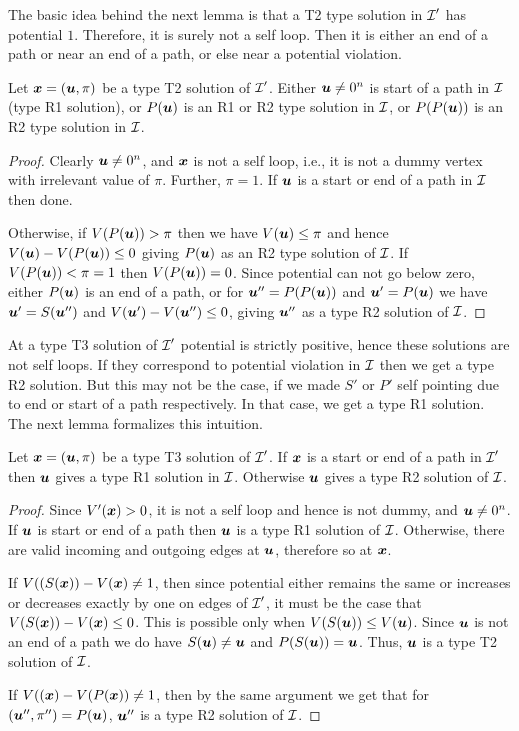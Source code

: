 The basic idea behind the next lemma is that a T2 type solution in $\mbox{${\mathcal I}$}'$ has
potential $1$. Therefore, it is surely not a self loop. Then it is either an end of a path or near an end of a path, or else near a potential violation. 

\begin{lemma}\label{lem:p2m-t2}
Let $\mbox{\boldmath $x$}=(\mbox{\boldmath $u$},\pi)$ be a type T2 solution of $\mbox{${\mathcal I}$}'$. Either $\mbox{\boldmath $u$} \neq 0^n$ is start of a path in $\mbox{${\mathcal I}$}$ (type R1 solution), or $P(\mbox{\boldmath $u$})$ is an R1 or R2 type solution in $\mbox{${\mathcal I}$}$, or $P(P(\mbox{\boldmath $u$}))$ is an R2 type solution in $\mbox{${\mathcal I}$}$.
\end{lemma}

\begin{proof}
Clearly $\mbox{\boldmath $u$} \neq 0^n$, and $\mbox{\boldmath $x$}$ is not a self loop, i.e., it is not a dummy vertex with irrelevant value of $\pi$. Further, $\pi=1$. If $\mbox{\boldmath $u$}$ is a start or end of a path in $\mbox{${\mathcal I}$}$ then done. 

Otherwise, if $V(P(\mbox{\boldmath $u$}))>\pi$ then we have $V(\mbox{\boldmath $u$})\le \pi$ and hence $V(\mbox{\boldmath $u$})-V(P(\mbox{\boldmath $u$}))\le 0$ giving $P(\mbox{\boldmath $u$})$ as an R2 type solution of $\mbox{${\mathcal I}$}$. 
If $V(P(\mbox{\boldmath $u$}))<\pi=1$ then $V(P(\mbox{\boldmath $u$}))=0$. Since potential can not go below zero, either $P(\mbox{\boldmath $u$})$ is an end of a path, or for $\mbox{\boldmath $u$}''=P(P(\mbox{\boldmath $u$}))$ and $\mbox{\boldmath $u$}'=P(\mbox{\boldmath $u$})$ we have $\mbox{\boldmath $u$}'=S(\mbox{\boldmath $u$}'')$ and $V(\mbox{\boldmath $u$}')-V(\mbox{\boldmath $u$}'')\le 0$, giving $\mbox{\boldmath $u$}''$ as a type R2 solution of $\mbox{${\mathcal I}$}$.
\end{proof}

At a type T3 solution of $\mbox{${\mathcal I}$}'$ potential is strictly positive, hence these solutions are not self loops. If they correspond to potential violation in $\mbox{${\mathcal I}$}$ then we get a type R2 solution. But this may not be the case, if we made $S'$ or $P'$ self pointing due to end or start of a path respectively. In that case, we get a type R1 solution. The next lemma formalizes this intuition. 

\begin{lemma}\label{lem:p2m-t3}
Let $\mbox{\boldmath $x$}=(\mbox{\boldmath $u$},\pi)$ be a type T3 solution of $\mbox{${\mathcal I}$}'$. If $\mbox{\boldmath $x$}$ is a start or end of a path in $\mbox{${\mathcal I}$}'$ then $\mbox{\boldmath $u$}$ gives a type R1 solution in $\mbox{${\mathcal I}$}$. Otherwise $\mbox{\boldmath $u$}$ gives a type R2 solution of $\mbox{${\mathcal I}$}$.
\end{lemma}

\begin{proof}
Since $V'(\mbox{\boldmath $x$})>0$, it is not a self loop and hence is not dummy, and $\mbox{\boldmath $u$}\neq 0^n$. If $\mbox{\boldmath $u$}$ is start or end of a path then $\mbox{\boldmath $u$}$ is a type R1 solution of $\mbox{${\mathcal I}$}$. Otherwise, there are valid incoming and outgoing edges at $\mbox{\boldmath $u$}$, therefore so at $\mbox{\boldmath $x$}$. 

If $V((S(\mbox{\boldmath $x$}))-V(\mbox{\boldmath $x$})\neq 1$, then since potential either remains the same or increases or decreases exactly by one on edges of $\mbox{${\mathcal I}$}'$, it must be the case that $V(S(\mbox{\boldmath $x$}))-V(\mbox{\boldmath $x$})\le 0$. This is possible only when $V(S(\mbox{\boldmath $u$}))\le V(\mbox{\boldmath $u$})$. Since $\mbox{\boldmath $u$}$ is not an end of a path we do have $S(\mbox{\boldmath $u$})\neq \mbox{\boldmath $u$}$ and $P(S(\mbox{\boldmath $u$}))=\mbox{\boldmath $u$}$. Thus, $\mbox{\boldmath $u$}$ is a type T2 solution of $\mbox{${\mathcal I}$}$.

If $V((\mbox{\boldmath $x$})-V(P(\mbox{\boldmath $x$}))\neq 1$, then by the same argument we get that for $(\mbox{\boldmath $u$}'',\pi'')=P(\mbox{\boldmath $u$})$, $\mbox{\boldmath $u$}''$ is a type R2 solution of $\mbox{${\mathcal I}$}$. 
\end{proof}

